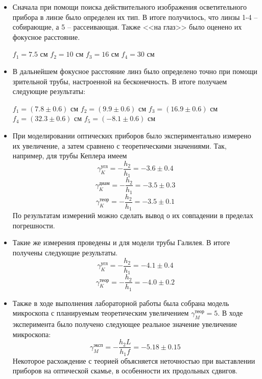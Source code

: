 \documentclass[a4paper,12pt]{article} %
\begin{document}
\begin{itemize}
	\item Сначала при помощи поиска действительного изображения осветительного прибора в линзе было определен их тип. В итоге получилось, что линзы 1-4 -- собирающие, а 5 -- рассеивающая. Также <<на глаз>> было оценено их фокусное расстояние.
	\begin{center}
		$f_1 = 7.5$ см \hspace{1cm}  $f_2 = 10$ см \hspace{1cm}  $f_3 = 16$ см\hspace{1cm}  $f_4 = 30$ см
	\end{center}
	\item В дальнейшем фокусное расстояние линз было определено точно при помощи зрительной трубы, настроенной на бесконечность. В итоге получаем следующие результаты:
	\begin{center}
		$f_1 = (7.8 \pm 0.6)$ см \hspace{1cm}  $f_2 = (9.9\pm0.6)$ см \hspace{1cm}  $f_3 = (16.9 \pm 0.6)$ см\hspace{1cm}  $f_4 = (32.3 \pm 0.6)$ см \hspace{1cm}  $f_5 = (-8.1 \pm 0.6)$ см
	\end{center}
	\item При моделировании оптических приборов было экспериментально измерено их увеличение, а затем сравнено с теоретическими значениями. Так, например, для трубы Кеплера имеем
	\[\gamma_K^\text{угл} = -\frac{h_2}{h_1} = -3.6 \pm 0.4 \]
	\[\gamma_K^\text{диам} = -\frac{h_2}{h_1} = -3.5 \pm 0.3 \]
	\[\gamma_K^\text{теор} = -\frac{h_2}{h_1} = -3.5 \pm 0.1 \]
	По результатам измерений можно сделать вывод о их совпадении в пределах погрешности.
	\item Такие же измерения проведены и для модели трубы Галилея. В итоге получены следующие результаты.
	\[\gamma_K^\text{угл} = -\frac{h_2}{h_1} = -4.1 \pm 0.4 \]
	\[\gamma_K^\text{теор} = -\frac{h_2}{h_1} = -4.0 \pm 0.2 \]
	\item Также в ходе выполнения лабораторной работы была собрана модель микроскопа с планируемым теоретическим увеличением $  \gamma_M^\text{теор} = 5 $. В ходе эксперимента было получено следующее реальное значение увеличение микроскопа:
	\[ \gamma_M^\text{эксп} = -\frac{h_2L}{h_1f} = -5.18 \pm 0.15 \]
	Некоторое расхождение с теорией объясняется неточностью при выставлении приборов на оптической скамье, в особенности их продольных сдвигов.
\end{itemize}
\end{document}
